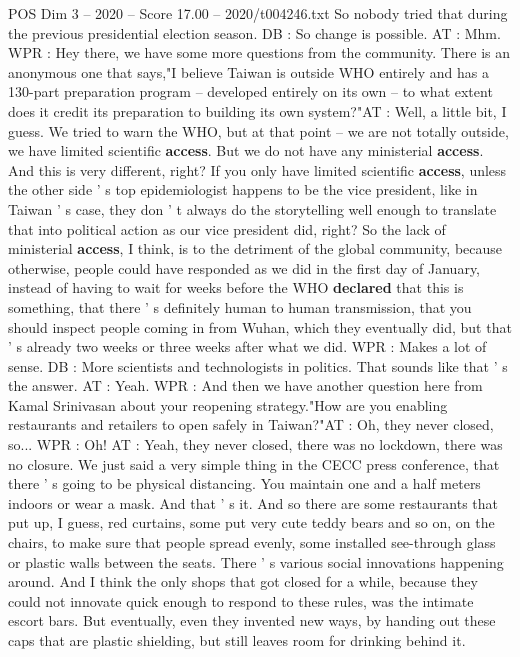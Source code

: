 \begin{textsample}{POS Dim 3 – 2020 – Score 17.00 – 2020/t004246.txt}
So nobody tried that during the previous presidential election season.
DB : So change is possible.
AT : Mhm.
WPR : Hey there, we have some more questions from the community.
There is an anonymous one that says,"I believe Taiwan is outside WHO entirely and has a 130-part preparation program -- developed entirely on its own -- to what extent does it credit its preparation to building its own system?"AT : Well, a little bit, I guess.
We tried to warn the WHO, but at that point -- we are not totally outside, we have limited scientific \textbf{access}.
But we do not have any ministerial \textbf{access}.
And this is very different, right?
If you only have limited scientific \textbf{access}, unless the other side ' s top epidemiologist happens to be the vice president, like in Taiwan ' s case, they don ' t always do the storytelling well enough to translate that into political action as our vice president did, right?
So the lack of ministerial \textbf{access}, I think, is to the detriment of the global community, because otherwise, people could have responded as we did in the first day of January, instead of having to wait for weeks before the WHO \textbf{declared} that this is something, that there ' s definitely human to human transmission, that you should inspect people coming in from Wuhan, which they eventually did, but that ' s already two weeks or three weeks after what we did.
WPR : Makes a lot of sense.
DB : More scientists and technologists in politics.
That sounds like that ' s the answer.
AT : Yeah.
WPR : And then we have another question here from Kamal Srinivasan about your reopening strategy."How are you enabling restaurants and retailers to open safely in Taiwan?"AT : Oh, they never closed, so...
WPR : Oh!
AT : Yeah, they never closed, there was no lockdown, there was no closure.
We just said a very simple thing in the CECC press conference, that there ' s going to be physical distancing.
You maintain one and a half meters indoors or wear a mask.
And that ' s it.
And so there are some restaurants that put up, I guess, red curtains, some put very cute teddy bears and so on, on the chairs, to make sure that people spread evenly, some installed see-through glass or plastic walls between the seats.
There ' s various social innovations happening around.
And I think the only shops that got closed for a while, because they could not innovate quick enough to respond to these rules, was the intimate escort bars.
But eventually, even they invented new ways, by handing out these caps that are plastic shielding, but still leaves room for drinking behind it.

\end{textsample}
